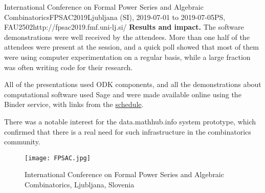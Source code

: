 \begin{event}{International Conference on Formal Power Series and Algebraic Combinatorics}{FPSAC2019}{Ljubljana (SI),
  2019-07-01 to
  2019-07-05}{PS, FAU}{250}{2}{http://fpsac2019.fmf.uni-lj.si/}
\textbf{Results and impact.} The software demonstrations were well
received by the attendees. More than one half of the attendees were
present at the session, and a quick poll showed that most of them were
using computer experimentation on a regular basis, while a large
fraction was often writing code for their research.

All of the presentations used ODK components, and all the
demonstrations about computational software used Sage and were made
available online using the Binder service, with links from the
\href{http://fpsac2019.fmf.uni-lj.si/schedule/}{schedule}.

There was a notable interest for the \textsf{data.math\-hub.info}
system prototype, which confirmed that there is a real need for such
infrastructure in the combinatorics community.

\begin{figure}[ht]
  \texttt{[image: FPSAC.jpg]}
  \caption*{International Conference on Formal Power Series and Algebraic Combinatorics, Ljubljana, Slovenia}
\end{figure}

\end{event}

